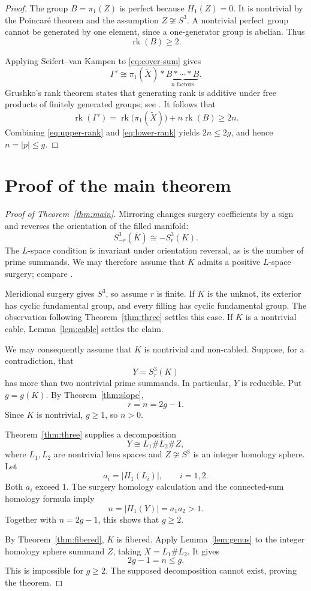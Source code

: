 \documentclass[11pt]{article}
\newcommand{\surg}[2]{S^3_{#1}(#2)}
\DeclareMathOperator{\rk}{rk}
\begin{document}
\begin{proof}
The group \(B=\pi_1(Z)\) is perfect because \(H_1(Z)=0\).
It is nontrivial by the Poincar\'e theorem and the assumption
\(Z\not\cong S^3\). A nontrivial perfect group cannot be generated by
one element, since a one-generator group is abelian. Thus
\[
    \rk(B)\geq 2.
\]

Applying Seifert--van Kampen to \eqref{eq:cover-sum} gives
\[
    \Gamma'\cong
    \pi_1(\widetilde X)*
    \underbrace{B*\cdots*B}_{n\text{ factors}}.
\]
Grushko's rank theorem states that generating rank is additive under
free products of finitely generated groups; see \cite{Stallings}.
It follows that
\begin{equation}\label{eq:lower-rank}
    \rk(\Gamma')
      =\rk\bigl(\pi_1(\widetilde X)\bigr)+n\rk(B)
      \geq 2n.
\end{equation}
Combining \eqref{eq:upper-rank} and \eqref{eq:lower-rank} yields
\(2n\leq 2g\), and hence \(n=|p|\leq g\).
\end{proof}

\section{Proof of the main theorem}

\begin{proof}[Proof of Theorem~\ref{thm:main}]
Mirroring changes surgery coefficients by a sign and reverses the
orientation of the filled manifold:
\[
    \surg{-r}{\overline K}\cong-\surg{r}{K}.
\]
The \(L\)-space condition is invariant under orientation reversal,
as is the number of prime summands. We may therefore assume that
\(K\) admits a positive \(L\)-space surgery; compare
\cite[Section~1]{HLZ}.

Meridional surgery gives \(S^3\), so assume \(r\) is finite.
If \(K\) is the unknot, its exterior has cyclic fundamental group,
and every filling has cyclic fundamental group. The observation
following Theorem~\ref{thm:three} settles this case.
If \(K\) is a nontrivial cable, Lemma~\ref{lem:cable} settles the
claim.

We may consequently assume that \(K\) is nontrivial and non-cabled.
Suppose, for a contradiction, that
\[
    Y=\surg{r}{K}
\]
has more than two nontrivial prime summands. In particular, \(Y\) is
reducible. Put \(g=g(K)\). By Theorem~\ref{thm:slope},
\[
    r=n=2g-1.
\]
Since \(K\) is nontrivial, \(g\geq 1\), so \(n>0\).

Theorem~\ref{thm:three} supplies a decomposition
\[
    Y\cong L_1\#L_2\# Z,
\]
where \(L_1,L_2\) are nontrivial lens spaces and \(Z\not\cong S^3\)
is an integer homology sphere. Let
\[
    a_i=|H_1(L_i)|,\qquad i=1,2.
\]
Both \(a_i\) exceed \(1\). The surgery homology calculation and the
connected-sum homology formula imply
\[
    n=|H_1(Y)|=a_1a_2>1.
\]
Together with \(n=2g-1\), this shows that \(g\geq 2\).

By Theorem~\ref{thm:fibered}, \(K\) is fibered.
Apply Lemma~\ref{lem:genus} to the integer homology sphere summand
\(Z\), taking \(X=L_1\#L_2\). It gives
\[
    2g-1=n\leq g.
\]
This is impossible for \(g\geq 2\). The supposed decomposition cannot
exist, proving the theorem.
\end{proof}
\end{document}
